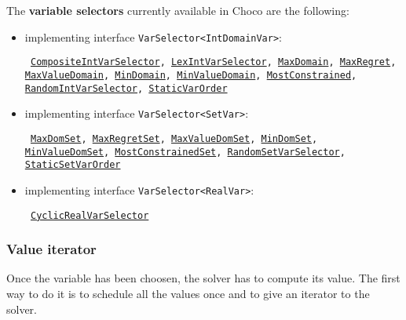 \noindent The \textbf{variable selectors} currently available in Choco are the following: 
\begin{itemize}
\item implementing interface \texttt{VarSelector<IntDomainVar>}:
\begin{notedef}\tt
\hyperlink{compositeintvarselector:compositeintvarselectorvarselector}{CompositeIntVarSelector}, \hyperlink{lexintvarselector:lexintvarselectorvarselector}{LexIntVarSelector}, \hyperlink{maxdomain:maxdomainvarselector}{MaxDomain}, \hyperlink{maxregret:maxregretvarselector}{MaxRegret}, \hyperlink{maxvaldomain:maxvaldomainvarselector}{MaxValueDomain}, \hyperlink{mindomain:mindomainvarselector}{MinDomain}, \hyperlink{minvaldomain:minvaldomainvarselector}{MinValueDomain}, \hyperlink{mostconstrained:mostconstrainedvarselector}{MostConstrained},  \hyperlink{randomvarint:randomvarintvarselector}{RandomIntVarSelector},  \hyperlink{staticvarorder:staticvarordervarselector}{StaticVarOrder}
\end{notedef}
\item implementing interface \texttt{VarSelector<SetVar>}:   
\begin{notedef}\tt
\hyperlink{maxdomset:maxdomsetvarselector}{MaxDomSet}, \hyperlink{maxregretset:maxregretsetvarselector}{MaxRegretSet}, \hyperlink{maxvaldomset:maxvaldomsetvarselector}{MaxValueDomSet}, \hyperlink{mindomset:mindomsetvarselector}{MinDomSet}, \hyperlink{minvaldomset:minvaldomsetvarselector}{MinValueDomSet}, \hyperlink{mostconstrainedset:mostconstrainedsetvarselector}{MostConstrainedSet},  \hyperlink{randomvarset:randomvarsetvarselector}{RandomSetVarSelector},  \hyperlink{staticsetvarorder:staticsetvarordervarselector}{StaticSetVarOrder}
\end{notedef}
\item implementing interface \texttt{VarSelector<RealVar>}:
\begin{notedef}\tt
\hyperlink{cyclicrealvarselector:cyclicrealvarselectorvarselector}{CyclicRealVarSelector}
\end{notedef}
\end{itemize}

\subsubsection{Value iterator}\label{solver:valueiterator}\hypertarget{solver:valueiterator}{}
Once the variable has been choosen, the solver has to compute its value. The first way to do it is to schedule all the values once and to give an iterator to the solver.

